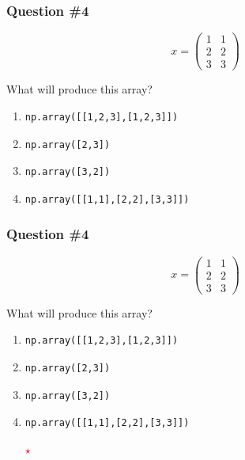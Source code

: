 \documentclass[11pt]{beamer}
\newcommand{\correctstar}{\textcolor{red}{$\star$}}
\begin{document}
\begin{frame}[fragile]
  \frametitle{Question \#4}
  \Enlarge

$$
x =
\left(
\begin{array}{cc}
1 & 1 \\
2 & 2 \\
3 & 3
\end{array}
\right)
$$

  What will produce this array?

  \begin{enumerate}[label=\Alph*]
  \item
  \begin{Verbatim}
np.array([[1,2,3],[1,2,3]])
  \end{Verbatim}
  \item
  \begin{Verbatim}
np.array([2,3])
  \end{Verbatim}
  \item
  \begin{Verbatim}
np.array([3,2])
  \end{Verbatim}
  \item
  \begin{Verbatim}
np.array([[1,1],[2,2],[3,3]])
  \end{Verbatim}
  \end{enumerate}
\end{frame}

\begin{frame}[fragile]
  \frametitle{Question \#4}
  \Enlarge

$$
x =
\left(
\begin{array}{cc}
1 & 1 \\
2 & 2 \\
3 & 3
\end{array}
\right)
$$

  What will produce this array?

  \begin{enumerate}[label=\Alph*]
  \item
  \begin{Verbatim}
np.array([[1,2,3],[1,2,3]])
  \end{Verbatim}
  \item
  \begin{Verbatim}
np.array([2,3])
  \end{Verbatim}
  \item
  \begin{Verbatim}
np.array([3,2])
  \end{Verbatim}
  \item
  \begin{Verbatim}
np.array([[1,1],[2,2],[3,3]])
  \end{Verbatim}
  \correctstar
  \end{enumerate}
\end{frame}
\end{document}
